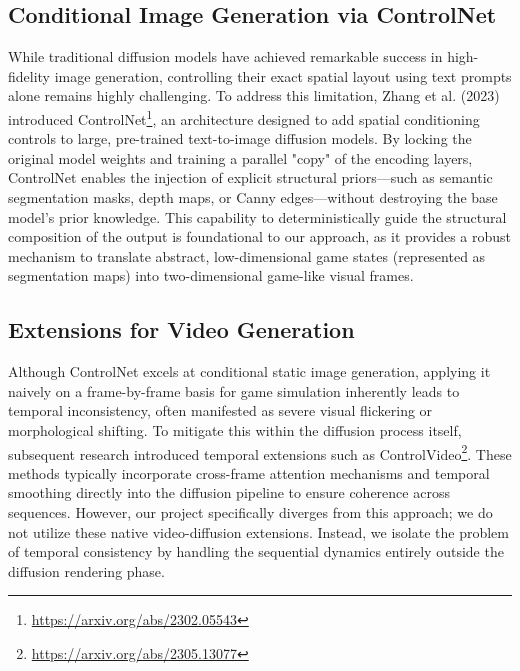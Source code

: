 \documentclass[twocolumn,a4paper]{article}
\begin{document}


\subsection{Conditional Image Generation via ControlNet}

While traditional diffusion models have achieved remarkable success in high-fidelity image generation, controlling their exact spatial layout using text prompts alone remains highly challenging. To address this limitation, Zhang et al. (2023) introduced ControlNet\footnote{\url{https://arxiv.org/abs/2302.05543}}, an architecture designed to add spatial conditioning controls to large, pre-trained text-to-image diffusion models. By locking the original model weights and training a parallel "copy" of the encoding layers, ControlNet enables the injection of explicit structural priors—such as semantic segmentation masks, depth maps, or Canny edges—without destroying the base model's prior knowledge.  This capability to deterministically guide the structural composition of the output is foundational to our approach, as it provides a robust mechanism to translate abstract, low-dimensional game states (represented as segmentation maps) into two-dimensional game-like visual frames.

\subsection{Extensions for Video Generation}

Although ControlNet excels at conditional static image generation, applying it naively on a frame-by-frame basis for game simulation inherently leads to temporal inconsistency, often manifested as severe visual flickering or morphological shifting. To mitigate this within the diffusion process itself, subsequent research introduced temporal extensions such as ControlVideo\footnote{\url{https://arxiv.org/abs/2305.13077}}. These methods typically incorporate cross-frame attention mechanisms and temporal smoothing directly into the diffusion pipeline to ensure coherence across sequences. However, our project specifically diverges from this approach; we do not utilize these native video-diffusion extensions. Instead, we isolate the problem of temporal consistency by handling the sequential dynamics entirely outside the diffusion rendering phase.
\end{document}
